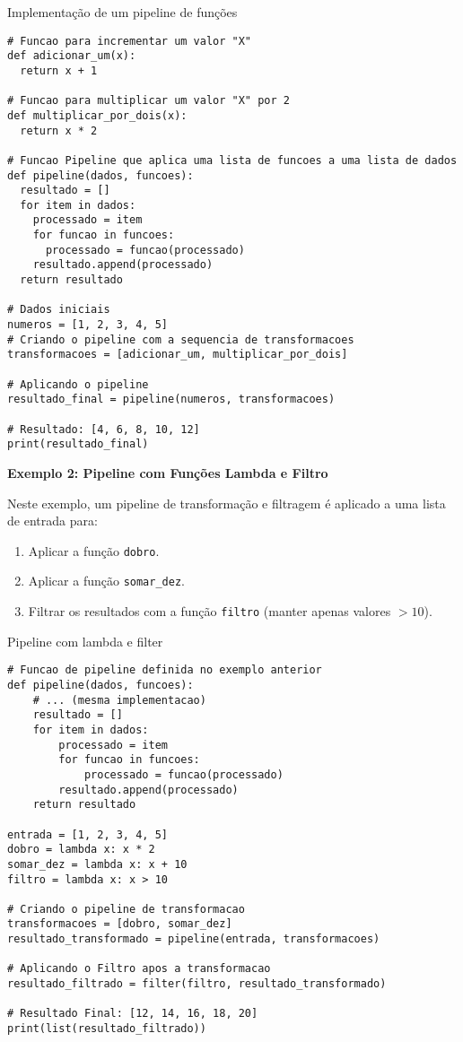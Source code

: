 \begin{listing}[H]{Implementação de um pipeline de funções}
    \label{listing:pipeline_generico}
    \begin{verbatim}
# Funcao para incrementar um valor "X"
def adicionar_um(x):
  return x + 1

# Funcao para multiplicar um valor "X" por 2
def multiplicar_por_dois(x):
  return x * 2

# Funcao Pipeline que aplica uma lista de funcoes a uma lista de dados
def pipeline(dados, funcoes):
  resultado = []
  for item in dados:
    processado = item
    for funcao in funcoes:
      processado = funcao(processado)
    resultado.append(processado)
  return resultado

# Dados iniciais
numeros = [1, 2, 3, 4, 5]
# Criando o pipeline com a sequencia de transformacoes
transformacoes = [adicionar_um, multiplicar_por_dois]

# Aplicando o pipeline
resultado_final = pipeline(numeros, transformacoes)

# Resultado: [4, 6, 8, 10, 12]
print(resultado_final)
    \end{verbatim}
\end{listing}

\textbf{Exemplo 2: Pipeline com Funções Lambda e Filtro}

Neste exemplo, um pipeline de transformação e filtragem é aplicado a uma lista de entrada para:
\begin{enumerate}
    \item Aplicar a função \texttt{dobro}.
    \item Aplicar a função \texttt{somar\_dez}.
    \item Filtrar os resultados com a função \texttt{filtro} (manter apenas valores $> 10$).
\end{enumerate}

\begin{listing}[H]{Pipeline com lambda e filter}
    \label{listing:pipeline_lambda}
    \begin{verbatim}
# Funcao de pipeline definida no exemplo anterior
def pipeline(dados, funcoes):
    # ... (mesma implementacao)
    resultado = []
    for item in dados:
        processado = item
        for funcao in funcoes:
            processado = funcao(processado)
        resultado.append(processado)
    return resultado

entrada = [1, 2, 3, 4, 5]
dobro = lambda x: x * 2
somar_dez = lambda x: x + 10
filtro = lambda x: x > 10

# Criando o pipeline de transformacao
transformacoes = [dobro, somar_dez]
resultado_transformado = pipeline(entrada, transformacoes)

# Aplicando o Filtro apos a transformacao
resultado_filtrado = filter(filtro, resultado_transformado)

# Resultado Final: [12, 14, 16, 18, 20]
print(list(resultado_filtrado))
    \end{verbatim}
\end{listing}

